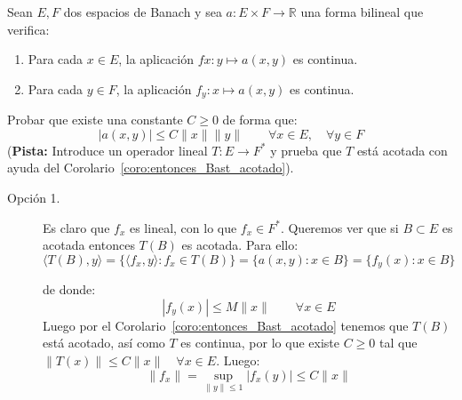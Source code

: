\begin{ejercicio}\label{ej:4_rel2} %
    Sean $E,F$ dos espacios de Banach y sea $a:E\times F\to \mathbb{R}$ una forma bilineal que verifica:
    \begin{enumerate}
        \item Para cada $x\in E$, la aplicación $fx:y\longmapsto a(x,y)$ es continua.
        \item Para cada $y\in F$, la aplicación $f_y:x\longmapsto a(x,y)$ es continua.
    \end{enumerate}
    Probar que existe una constante $C\geq 0$ de forma que:
    \begin{equation*}
        |a(x,y)| \leq C\|x\|\|y\| \qquad \forall x\in E, \quad \forall y\in F
    \end{equation*}
    (\textbf{Pista:} Introduce un operador lineal $T:E\to F^\ast$ y prueba que $T$ está acotada con ayuda del Corolario~\ref{coro:entonces_Bast_acotado}).\\

    \begin{description}
        \item [Opción 1.] Es claro que $f_x$ es lineal, con lo que $f_x\in F^\ast$.
            Queremos ver que si $B\subset E$ es acotada entonces $T(B)$ es acotada. Para ello:
            \begin{equation*}
                \langle T(B),y \rangle  = \{\langle f_x,y \rangle :f_x\in T(B)\} = \{a(x,y):x\in B\} = \{f_y(x) : x\in B\}
            \end{equation*}

            de donde:
            \begin{equation*}
                |f_y(x)| \leq M \|x\| \qquad \forall x\in E
            \end{equation*}
            Luego por el Corolario~\ref{coro:entonces_Bast_acotado} tenemos que $T(B)$ está acotado, así como $T$ es continua, por lo que existe $C\geq 0$ tal que $\|T(x)\|\leq C\|x\|\quad \forall x\in E$. Luego:
            \begin{equation*}
                \|f_x\| = \sup_{\|y\|\leq 1}|f_x(y)| \leq C\|x\|
            \end{equation*}


\end{description}
\end{ejercicio}
